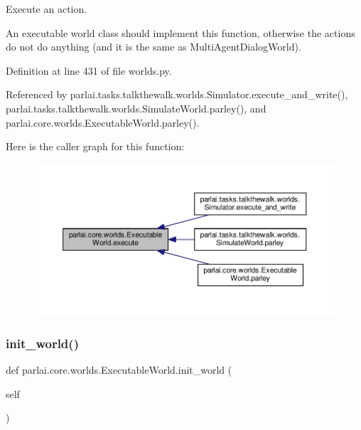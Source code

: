 \begin{DoxyVerb}Execute an action.

An executable world class should implement this function, otherwise
the actions do not do anything (and it is the same as MultiAgentDialogWorld).
\end{DoxyVerb}
 

Definition at line 431 of file worlds.\+py.



Referenced by parlai.\+tasks.\+talkthewalk.\+worlds.\+Simulator.\+execute\+\_\+and\+\_\+write(), parlai.\+tasks.\+talkthewalk.\+worlds.\+Simulate\+World.\+parley(), and parlai.\+core.\+worlds.\+Executable\+World.\+parley().

Here is the caller graph for this function\+:
\nopagebreak
\begin{figure}[H]
\begin{center}
\leavevmode
\includegraphics[width=350pt]{classparlai_1_1core_1_1worlds_1_1ExecutableWorld_a318fbf7c75178f62a6d46647f1a063fa_icgraph}
\end{center}
\end{figure}
\mbox{\label{classparlai_1_1core_1_1worlds_1_1ExecutableWorld_a8bb31ec1d93a94cb261f89ce0992159a}} 
\subsubsection{\texorpdfstring{init\+\_\+world()}{init\_world()}}
{\footnotesize\ttfamily def parlai.\+core.\+worlds.\+Executable\+World.\+init\+\_\+world (\begin{DoxyParamCaption}\item[{}]{self }\end{DoxyParamCaption})}

